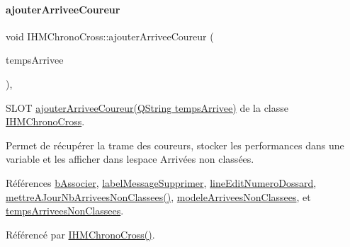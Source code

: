 \paragraph{\texorpdfstring{ajouter\+Arrivee\+Coureur}{ajouterArriveeCoureur}}
{\footnotesize\ttfamily void I\+H\+M\+Chrono\+Cross\+::ajouter\+Arrivee\+Coureur (\begin{DoxyParamCaption}\item[{Q\+String}]{temps\+Arrivee }\end{DoxyParamCaption})\hspace{0.3cm}{\ttfamily [private]}, {\ttfamily [slot]}}



S\+L\+OT \hyperlink{class_i_h_m_chrono_cross_a2ce63851d1f2723057ac649b7e320cfe}{ajouter\+Arrivee\+Coureur(\+Q\+String temps\+Arrivee)} de la classe \hyperlink{class_i_h_m_chrono_cross}{I\+H\+M\+Chrono\+Cross}. 

Permet de récupérer la trame des coureurs, stocker les performances dans une variable et les afficher dans l\textquotesingle{}espace Arrivées non classées. 

Références \hyperlink{class_i_h_m_chrono_cross_aec2458a0c2ff0d2c37fa409fb8e99ce7}{b\+Associer}, \hyperlink{class_i_h_m_chrono_cross_a6d818ff507406ebf299c571e0e5c1e49}{label\+Message\+Supprimer}, \hyperlink{class_i_h_m_chrono_cross_ad2e156ff9412644debf8da7a3ec1566d}{line\+Edit\+Numero\+Dossard}, \hyperlink{class_i_h_m_chrono_cross_a1b23fda62742f2dd17652d3abcb33dd6}{mettre\+A\+Jour\+Nb\+Arrivees\+Non\+Classees()}, \hyperlink{class_i_h_m_chrono_cross_a12a210c6a93f70df764841b7d322b05c}{modele\+Arrivees\+Non\+Classees}, et \hyperlink{class_i_h_m_chrono_cross_a9d0542a5334cd284d1ea9cf732cb013e}{temps\+Arrivees\+Non\+Classees}.



Référencé par \hyperlink{class_i_h_m_chrono_cross_a479fc90733fba3e65fb06aa4a3adc02e}{I\+H\+M\+Chrono\+Cross()}.


